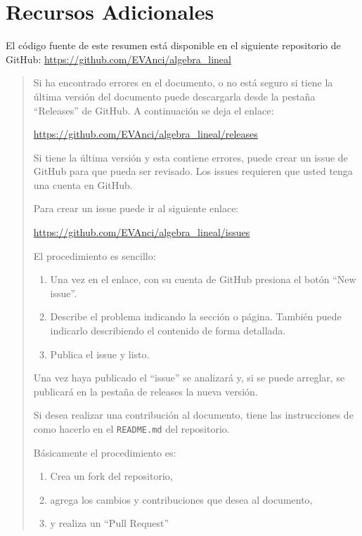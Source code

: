   \section*{Recursos Adicionales}
  \noindent El código fuente de este resumen está disponible en el siguiente repositorio de GitHub: \url{https://github.com/EVAnci/algebra_lineal}
  \vspace{5pt}

  \begin{quote}
  Si ha encontrado errores en el documento, o no está seguro si tiene la última versión del documento puede descargarla desde la pestaña ``Releases'' de GitHub. A continuación se deja el enlace:

  \url{https://github.com/EVAnci/algebra_lineal/releases}

  \vspace{5pt}

  Si tiene la última versión y esta contiene errores, puede crear un issue de GitHub para que pueda ser revisado. Los issues requieren que usted tenga una cuenta en GitHub.

  Para crear un issue puede ir al siguiente enlace:

  \url{https://github.com/EVAnci/algebra_lineal/issues}

  El procedimiento es sencillo:
  \begin{enumerate}
    \item Una vez en el enlace, con su cuenta de GitHub presiona el botón ``New issue''.
    \item Describe el problema indicando la sección o página. También puede indicarlo describiendo el contenido de forma detallada.
    \item Publica el issue y listo.
  \end{enumerate}
  Una vez haya publicado el ``issue'' se analizará y, si se puede arreglar, se publicará en la pestaña de releases la nueva versión.

  \vspace{5pt}

  Si desea realizar una contribución al documento, tiene las instrucciones de como hacerlo en el \texttt{README.md} del repositorio. 

  Básicamente el procedimiento es:
  \begin{enumerate}
    \item Crea un fork del repositorio,
    \item agrega los cambios y contribuciones que desea al documento,
    \item y realiza un ``Pull Request''
  \end{enumerate}
  \end{quote}